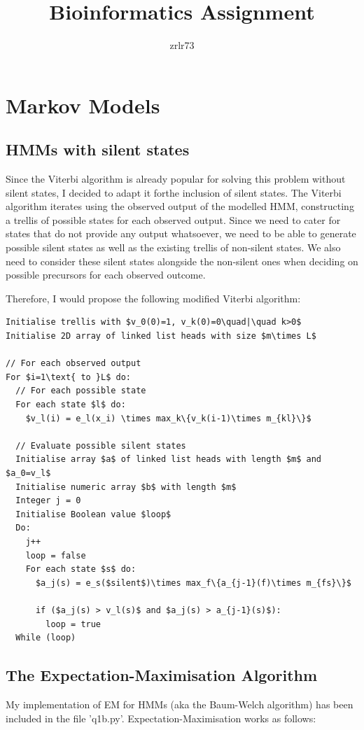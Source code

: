 \documentclass[11pt]{article} %
\title{\vspace{-1.6cm}Bioinformatics Assignment}
\author{zrlr73}
\date{} %
\begin{document}
\maketitle

\section{Markov Models}
\subsection{HMMs with silent states}
Since the Viterbi algorithm is already popular for solving this problem without silent states, I decided to adapt it forthe inclusion of silent states. The Viterbi algorithm iterates using the observed output of the modelled HMM, constructing a trellis of possible states for each observed output. Since we need to cater for states that do not provide any output whatsoever, we need to be able to generate possible silent states as well as the existing trellis of non-silent states. We also need to consider these silent states alongside the non-silent ones when deciding on possible precursors for each observed outcome.

Therefore, I would propose the following modified Viterbi algorithm:
\begin{lstlisting}
Initialise trellis with $v_0(0)=1, v_k(0)=0\quad|\quad k>0$
Initialise 2D array of linked list heads with size $m\times L$

// For each observed output
For $i=1\text{ to }L$ do:
  // For each possible state
  For each state $l$ do:
    $v_l(i) = e_l(x_i) \times max_k\{v_k(i-1)\times m_{kl}\}$

  // Evaluate possible silent states
  Initialise array $a$ of linked list heads with length $m$ and $a_0=v_l$
  Initialise numeric array $b$ with length $m$
  Integer j = 0
  Initialise Boolean value $loop$
  Do:
    j++
    loop = false
    For each state $s$ do:
      $a_j(s) = e_s($silent$)\times max_f\{a_{j-1}(f)\times m_{fs}\}$

      if ($a_j(s) > v_l(s)$ and $a_j(s) > a_{j-1}(s)$):
        loop = true
  While (loop)

\end{lstlisting}

\subsection{The Expectation-Maximisation Algorithm}
My implementation of EM for HMMs (aka the Baum-Welch algorithm) has been included in the file 'q1b.py'. Expectation-Maximisation works as follows:
\end{document}
